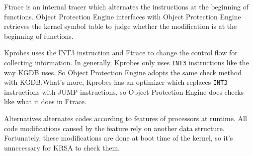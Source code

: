 \documentclass[conference]{IEEEtran}
\begin{document}

Ftrace is an internal tracer which alternates the instructions at the beginning of functions. Object Protection Engine interfaces with Object Protection Engine retrieves the kernel symbol table to judge whether the modification is at the beginning of functions. 

Kprobes uses the INT3 instruction and Ftrace to change the control flow for collecting information.
In generally, Kprobes only uses \verb|INT3| instructions like the way KGDB uses. So Object Protection Engine adopts the same check method with KGDB\@.What's more, Kprobes has an optimizer which replaces \verb|INT3| instructions with JUMP instructions, so Object Protection Engine does checks like what it does in Ftrace. 

Alternatives alternates codes according to features of processors at runtime. All code modifications caused by the feature rely on another data structure. Fortunately, these modifications are done at boot time of the kernel, so it's unnecessary for KRSA to check them.
\end{document}
